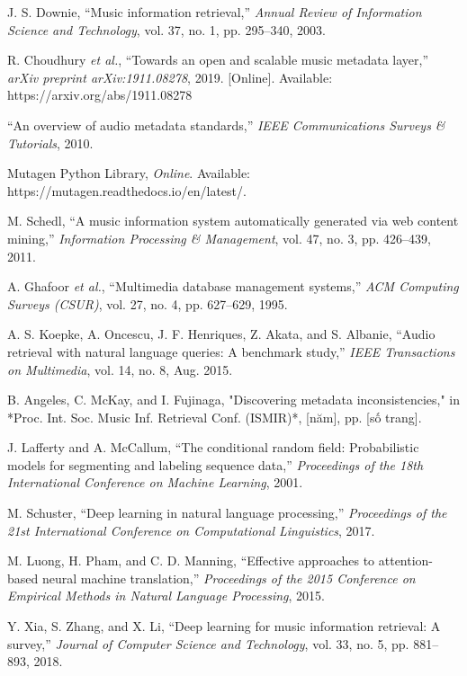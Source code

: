 \documentclass[conference]{IEEEtran}
\begin{document}
\renewcommand\refname{TÀI LIỆU THAM KHẢO}
\begin{thebibliography}{1}

J. S. Downie, ``Music information retrieval,'' \textit{Annual Review of Information Science and Technology}, vol. 37, no. 1, pp. 295--340, 2003.

R. Choudhury \textit{et al.}, ``Towards an open and scalable music metadata layer,'' \textit{arXiv preprint arXiv:1911.08278}, 2019. [Online]. Available: https://arxiv.org/abs/1911.08278

``An overview of audio metadata standards,'' \textit{IEEE Communications Surveys \& Tutorials}, 2010.

Mutagen Python Library, \textit{Online}. Available: https://mutagen.readthedocs.io/en/latest/.

M. Schedl, ``A music information system automatically generated via web content mining,'' \textit{Information Processing \& Management}, vol. 47, no. 3, pp. 426--439, 2011.

A. Ghafoor \textit{et al.}, ``Multimedia database management systems,'' \textit{ACM Computing Surveys (CSUR)}, vol. 27, no. 4, pp. 627--629, 1995.

A. S. Koepke, A. Oncescu, J. F. Henriques, Z. Akata, and S. Albanie, “Audio retrieval with natural language queries: A benchmark study,” \textit{IEEE Transactions on Multimedia}, vol. 14, no. 8, Aug. 2015.

\bibitem{}B. Angeles, C. McKay, and I. Fujinaga, "Discovering metadata inconsistencies," in *Proc. Int. Soc. Music Inf. Retrieval Conf. (ISMIR)*, [năm], pp. [số trang].

J. Lafferty and A. McCallum, ``The conditional random field: Probabilistic models for segmenting and labeling sequence data,'' \textit{Proceedings of the 18th International Conference on Machine Learning}, 2001.

M. Schuster, ``Deep learning in natural language processing,'' \textit{Proceedings of the 21st International Conference on Computational Linguistics}, 2017.

M. Luong, H. Pham, and C. D. Manning, ``Effective approaches to attention-based neural machine translation,'' \textit{Proceedings of the 2015 Conference on Empirical Methods in Natural Language Processing}, 2015.

Y. Xia, S. Zhang, and X. Li, ``Deep learning for music information retrieval: A survey,'' \textit{Journal of Computer Science and Technology}, vol. 33, no. 5, pp. 881--893, 2018.





\end{thebibliography}
\end{document}
